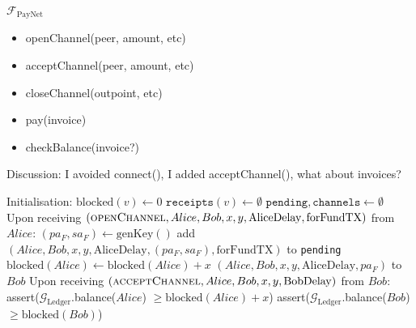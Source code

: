 \begin{functionality}{$\mathcal{F}_{\mathrm{PayNet}}$}
  \label{alg:payfunc}
    \begin{itemize}
      \item openChannel(peer, amount, etc)
      \item acceptChannel(peer, amount, etc)
      \item closeChannel(outpoint, etc)
      \item pay(invoice)
      \item checkBalance(invoice?)
    \end{itemize}
    Discussion: I avoided connect(), I added acceptChannel(), what about
    invoices?
  \begin{algorithmic}[1]
    \State Initialisation:
      \Indent
        \State $\mathrm{blocked}\left(v\right) \gets 0$
        \State $\mathtt{receipts}\left(v\right) \gets \emptyset$
      \EndFor
      \State $\mathtt{pending}, \mathtt{channels} \gets \emptyset$
      \EndIndent
    \State
    \State Upon receiving $\left(\textsc{openChannel}, Alice, Bob, x, y,
    \mathrm{AliceDelay}, \mathrm{forFundTX}\right)$ from $Alice$:
    \Indent
        \State $\left(pa_F, sa_F\right) \gets \mathrm{genKey}\left(\right)$
        \State add $\left(Alice, Bob, x, y, \mathrm{AliceDelay}, \left(pa_F,
        sa_F\right), \mathrm{forFundTX}\right)$ to \texttt{pending}
        \State $\mathrm{blocked}\left(Alice\right) \leftarrow
        \mathrm{blocked}\left(Alice\right) + x$
        \State \Return $\left(Alice, Bob, x, y, \mathrm{AliceDelay},
        pa_F\right)$ to $Bob$ 
      \EndIf
    \EndIndent
    \State
    \State Upon receiving $\left(\textsc{acceptChannel}, Alice, Bob, x, y,
    \mathrm{BobDelay}\right)$ from $Bob$: 
    \Indent
        \State assert($\mathcal{G}_{\mathrm{Ledger}}$.balance($Alice$) $\geq
        \mathrm{blocked}\left(Alice\right) + x$)
        \State assert($\mathcal{G}_{\mathrm{Ledger}}$.balance($Bob$) $\geq
        \mathrm{blocked}\left(Bob\right)$) 

\end{algorithmic}
\end{functionality}
